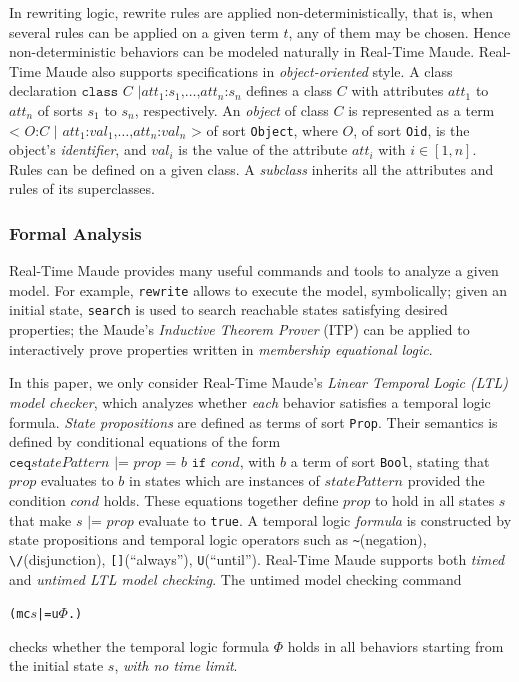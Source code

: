 \documentclass[journal]{IEEEtranTIE}
\begin{document}
In rewriting logic, rewrite rules are applied non-deterministically,
that is, when several rules can be applied on a given term $t$, any of
them may be chosen. Hence non-deterministic behaviors can be modeled
naturally in Real-Time Maude.  Real-Time Maude also supports
specifications in \emph{object-oriented} style.  A class declaration
$\texttt{class }C\texttt{ |
}att_1\texttt{:}s_1\texttt{,}\ldots\texttt{,}att_n\texttt{:}s_n$
defines a class $C$ with attributes $att_1$ to $att_n$ of sorts $s_1$
to $s_n$, respectively. An \emph{object} of class $C$ is represented
as a term $\texttt{< } O\texttt{:} C \texttt{ | }
att_1\texttt{:}val_1\texttt{,} \ldots
\texttt{,}att_n\texttt{:}val_n\texttt{ >}$ of sort \verb|Object|,
where $O$, of sort \verb|Oid|, is the object's \emph{identifier}, and
$val_i$ is the value of the attribute $att_i$ with $i\in [1,n]$. Rules
can be defined on a given class. A \emph{subclass} inherits all the
attributes and rules of its superclasses.

\subsubsection{Formal Analysis}
Real-Time Maude provides many useful commands and tools to analyze a
given model. For example, \verb|rewrite| allows to execute the model,
symbolically; given an initial state, \verb|search| is used to search
reachable states satisfying desired properties; the Maude's
\emph{Inductive Theorem Prover} (ITP) can be applied to interactively
prove properties written in \emph{membership equational logic}.

In this paper, we only consider Real-Time Maude's \emph{Linear
  Temporal Logic (LTL) model checker}, which analyzes whether
\emph{each} behavior satisfies a temporal logic formula. \emph{State
  propositions} are defined as terms of sort \verb|Prop|. Their
semantics is defined by conditional equations of the form $\texttt{ceq
} \mathit{statePattern} \texttt{ |= } \mathit{prop} \texttt{ = } b
\texttt{ if } cond$, with $b$ a term of sort \verb|Bool|, stating that
$\mathit{prop}$ evaluates to $b$ in states which are instances of
$\mathit{statePattern}$ provided the condition $cond$ holds. These
equations together define $\mathit{prop}$ to hold in all states $s$
that make $s \texttt{ |= } \mathit{prop}$ evaluate to \verb|true|. A
temporal logic \emph{formula} is constructed by state propositions and
temporal logic operators such as \verb|~|(negation),
\verb|\/|(disjunction), \verb|[]|(``always''),
\verb|U|(``until''). Real-Time Maude supports both \emph{timed} and
\emph{untimed LTL model checking}. The untimed model checking command
\begin{alltt}
  (mc \(s\) |=u \(\Phi\) .)
\end{alltt}
checks whether the temporal logic formula $\Phi$ holds in all
behaviors starting from the initial state $s$, \emph{with no time
  limit}.
\end{document}

